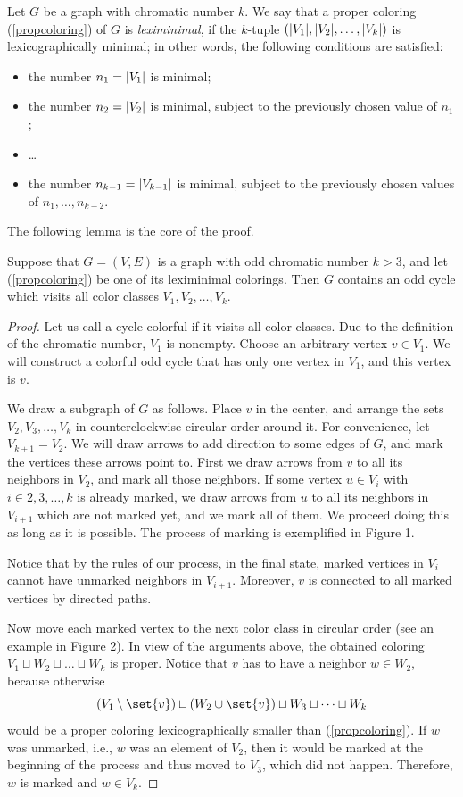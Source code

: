 \begin{problem}
Let $G$ be a graph with chromatic number $k$. We say that a proper coloring (\ref{propcoloring}) of $G$ is \textit{leximinimal}, if the $k$-tuple $(\lvert V_1\rvert, \lvert V_2\rvert, \dots , \lvert V_k\rvert)$ is lexicographically minimal; in other words, the following conditions are satisfied: 
\begin{itemize}
\item the number $n_1 = \lvert V_1\rvert$ is minimal; 
\item the number $n_2 = \lvert V_2\rvert$ is
minimal, subject to the previously chosen value of $n_1$; 
\item \dots  
\item the number $n_{k-1}  = \lvert V_{k-1}\rvert$ is minimal,
subject to the previously chosen values of $n_1, \dots , n_{k-2}$.
\end{itemize}
The following lemma is the core of the proof.
\begin{lemma}
\label{leximinlemma} 
Suppose that $G = (V, E)$ is a graph with odd chromatic number $k > 3$, and let (\ref{propcoloring}) be one of its leximinimal colorings. Then $G$ contains an odd cycle which visits all color classes
$V_1, V_2, \dots, V_k$.
\end{lemma}
\begin{proof}
Let us call a cycle colorful if it visits all color classes. Due to the definition of the chromatic number, $V_1$ is nonempty. Choose an arbitrary vertex $v \in V_1$. We will construct a colorful odd cycle that has only one vertex in $V_1$, and this vertex is $v$. 

We draw a subgraph of $G$ as follows. Place $v$ in the center, and arrange the sets $V_2, V_3, \dots , V_k$ in counterclockwise circular order around it. For convenience, let $V_{k+1} = V_2$. We will draw arrows to add direction to some edges of $G$, and mark the vertices these arrows point to. First we draw arrows from $v$ to all its neighbors in $V_2$, and mark all those neighbors. If some vertex $u \in V_i$ with $i \in {2, 3, \dots , k}$ is already marked, we draw arrows from $u$ to all its neighbors in $V_{i+1}$ which are not marked yet, and we mark all of them. We proceed doing this as long as it is possible. The process of marking is exemplified in Figure 1.

Notice that by the rules of our process, in the final state, marked vertices in $V_i$ cannot have unmarked neighbors in $V_{i+1}$. Moreover, $v$ is connected to all marked vertices by directed paths. 

Now move each marked vertex to the next color class in circular order (see an example in Figure 2). In view of the arguments above, the obtained coloring $V_1 \sqcup W_2 \sqcup \dots \sqcup W_k$ is proper. Notice that $v$ has to have a neighbor $w \in W_2$, because otherwise
\begin{equation}
(V_1  \setminus \set{v}) \sqcup (W_2 \cup \set{v}) \sqcup W_3 \sqcup \dots \sqcup W_k
\end{equation}
would be a proper coloring lexicographically smaller than (\ref{propcoloring}). If $w$ was unmarked, i.e., $w$ was an element of $V_2$, then it would be marked at the beginning of the process and thus moved to $V_3$, which did not happen. Therefore, $w$ is marked and $w \in V_k$.


\end{proof}
\end{problem}
